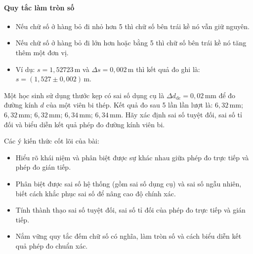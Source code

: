 \paragraph{Quy tắc làm tròn số}
\begin{itemize}
\item Nếu chữ số ở hàng bỏ đi nhỏ hơn 5 thì chữ số bên trái kề nó vẫn giữ nguyên.
\item Nếu chữ số ở hàng bỏ đi lớn hơn hoặc bằng 5 thì chữ số bên trái kề nó tăng thêm một đơn vị.
\item Ví dụ: $s = 1,52723\,\mathrm{m}$ và $\Delta s = 0,002\,\mathrm{m}$ thì kết quả đo ghi là: $s = (1,527 \pm 0,002)\,\mathrm{m}$.
\end{itemize}
\begin{vd}
Một học sinh sử dụng thước kẹp có sai số dụng cụ là $\Delta d_{\text{dc}} = 0,02\,\mathrm{mm}$ để đo đường kính $d$ của một viên bi thép. Kết quả đo sau 5 lần lần lượt là: $6,32\,\mathrm{mm}$; $6,32\,\mathrm{mm}$; $6,32\,\mathrm{mm}$; $6,34\,\mathrm{mm}$; $6,34\,\mathrm{mm}$. Hãy xác định sai số tuyệt đối, sai số tỉ đối và biểu diễn kết quả phép đo đường kính viên bi.
\end{vd}
\begin{kienthuc}
Các ý kiến thức cốt lõi của bài:
\begin{itemize}
\item Hiểu rõ khái niệm và phân biệt được sự khác nhau giữa phép đo trực tiếp và phép đo gián tiếp.
\item Phân biệt được sai số hệ thống (gồm sai số dụng cụ) và sai số ngẫu nhiên, biết cách khắc phục sai số để nâng cao độ chính xác.
\item Tính thành thạo sai số tuyệt đối, sai số tỉ đối của phép đo trực tiếp và gián tiếp.
\item Nắm vững quy tắc đếm chữ số có nghĩa, làm tròn số và cách biểu diễn kết quả phép đo chuẩn xác.
\end{itemize}
\end{kienthuc}
